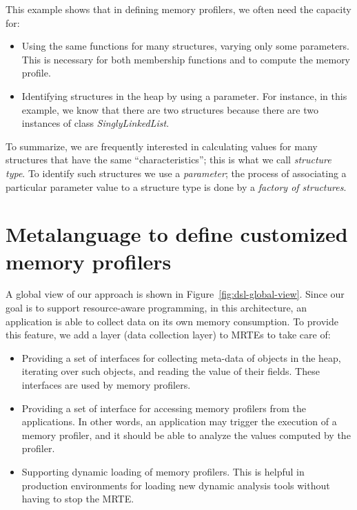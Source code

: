 This example shows that in defining memory profilers, we often need the capacity for:

\begin{itemize}
\item Using the same functions for many structures, varying only some parameters. This is necessary for both membership functions and to compute the memory profile.

\item Identifying structures in the heap by using a parameter. For instance, in this example, we know that there are two structures because there are two instances of class \textit{SinglyLinkedList}.
\end{itemize}

To summarize, we are frequently interested in calculating values for many structures that have the same ``characteristics''; this is what we call \textit{structure type}.
To identify such structures we use a \textit{parameter}; the process of associating a particular parameter value to a structure type is done by a \textit{factory of structures}. 

\section{Metalanguage to define customized memory profilers}\label{sec:approach}

A global view of our approach is shown in Figure~\ref{fig:dsl-global-view}.
Since our goal is to support resource-aware programming, in this architecture, an application is able to collect data on its own memory consumption.
To provide this feature, we add a layer (data collection layer) to MRTEs to take care of: 

\begin{itemize}
\item Providing a set of interfaces for collecting meta-data of objects in the heap, iterating over such objects, and reading the value of their fields.
These interfaces are used by memory profilers.

\item Providing a set of interface for accessing memory profilers from the applications.
In other words, an application may trigger the execution of a memory profiler, and it should be able to analyze the values computed by the profiler.

\item Supporting dynamic loading of memory profilers.
This is helpful in production environments for loading new dynamic analysis tools without having to stop the MRTE.
\end{itemize}

